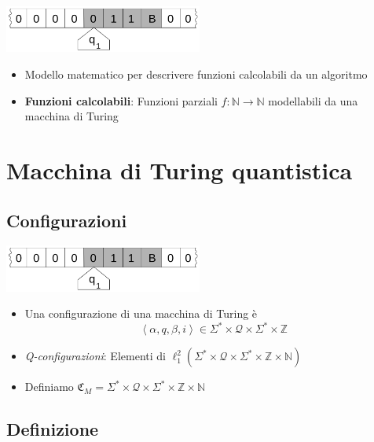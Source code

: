 \documentclass{beamer}
\begin{document}
\begin{frame}{\subsecname}{}
	\centering\includegraphics[width=6.5cm]{Turing_machine_2b.png}
	\begin{itemize}
		\item Modello matematico per descrivere funzioni calcolabili da un algoritmo
		\item \textbf{Funzioni calcolabili}: Funzioni parziali \( f : \mathbb{N} \rightarrow \mathbb{N} \) modellabili da una macchina di Turing
	\end{itemize}
\end{frame}

\section{Macchina di Turing quantistica}

\subsection{Configurazioni}

\begin{frame}{\subsecname}{}
	\centering\includegraphics[width=6.5cm]{Turing_machine_2b.png}
	\begin{itemize}
		\item Una configurazione di una macchina di Turing è
		\[ \left \langle \alpha, q, \beta, i \right \rangle \in \Sigma^{*} \times \mathcal{Q} \times \Sigma^{*} \times \mathbb{Z} \]
		\item \textit{Q-configurazioni}: Elementi di \( \ell^{2}_{1} \left ( \Sigma^{*} \times \mathcal{Q} \times \Sigma^{*} \times \mathbb{Z} \times \mathbb{N} \right ) \)
		\item Definiamo \( \mathfrak{C}_M = \Sigma^{*} \times \mathcal{Q} \times \Sigma^{*} \times \mathbb{Z} \times \mathbb{N} \)
	\end{itemize}
\end{frame}

\subsection{Definizione}
\end{document}
